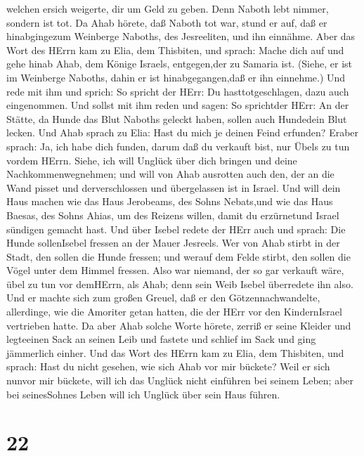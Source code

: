 welchen ersich weigerte, dir um Geld zu geben. Denn Naboth lebt nimmer,
sondern ist tot.  Da Ahab hörete, daß Naboth tot war, stund
er auf, daß er hinabgingezum Weinberge Naboths, des Jesreeliten, und ihn
einnähme.  Aber das Wort des HErrn kam zu Elia, dem
Thisbiten, und sprach:  Mache dich auf und gehe hinab Ahab,
dem Könige Israels, entgegen,der zu Samaria ist. (Siehe, er ist im
Weinberge Naboths, dahin er ist hinabgegangen,daß er ihn einnehme.)
 Und rede mit ihm und sprich: So spricht der HErr: Du
hasttotgeschlagen, dazu auch eingenommen. Und sollst mit ihm reden und
sagen: So sprichtder HErr: An der Stätte, da Hunde das Blut Naboths
geleckt haben, sollen auch Hundedein Blut lecken.  Und Ahab
sprach zu Elia: Hast du mich je deinen Feind erfunden? Eraber sprach:
Ja, ich habe dich funden, darum daß du verkauft bist, nur Übels zu tun
vordem HErrn.  Siehe, ich will Unglück über dich bringen
und deine Nachkommenwegnehmen; und will von Ahab ausrotten auch den, der
an die Wand pisset und derverschlossen und übergelassen ist in Israel.
 Und will dein Haus machen wie das Haus Jerobeams, des
Sohns Nebats,und wie das Haus Baesas, des Sohns Ahias, um des Reizens
willen, damit du erzürnetund Israel sündigen gemacht hast. 
Und über Isebel redete der HErr auch und sprach: Die Hunde sollenIsebel
fressen an der Mauer Jesreels.  Wer von Ahab stirbt in der
Stadt, den sollen die Hunde fressen; und werauf dem Felde stirbt, den
sollen die Vögel unter dem Himmel fressen.  Also war
niemand, der so gar verkauft wäre, übel zu tun vor demHErrn, als Ahab;
denn sein Weib Isebel überredete ihn also.  Und er machte
sich zum großen Greuel, daß er den Götzennachwandelte, allerdinge, wie
die Amoriter getan hatten, die der HErr vor den KindernIsrael vertrieben
hatte.  Da aber Ahab solche Worte hörete, zerriß er seine
Kleider und legteeinen Sack an seinen Leib und fastete und schlief im
Sack und ging jämmerlich einher.  Und das Wort des HErrn
kam zu Elia, dem Thisbiten, und sprach:  Hast du nicht
gesehen, wie sich Ahab vor mir bückete? Weil er sich nunvor mir bückete,
will ich das Unglück nicht einführen bei seinem Leben; aber bei
seinesSohnes Leben will ich Unglück über sein Haus führen.

\hypertarget{section-21}{%
\section{22}\label{section-21}}

